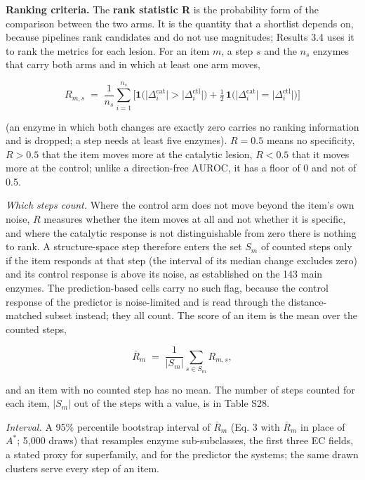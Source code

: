 \documentclass[
  10pt,
]{article}
\DeclareRobustCommand{\_}{\textunderscore\hspace{0pt}}
\begin{document}
\textbf{Ranking
criteria.} The
\textbf{rank
statistic R} is the
probability form of
the comparison
between the two
arms. It is the
quantity that a
shortlist depends
on, because
pipelines rank
candidates and do
not use magnitudes;
Results 3.4 uses it
to rank the metrics
for each lesion. For
an item \(m\), a
step \(s\) and the
\(n_s\) enzymes that
carry both arms and
in which at least
one arm moves,

\begin{equation*}R_{m,s} \;=\; \frac{1}{n_s}\sum_{i=1}^{n_s}\Big[\mathbf{1}\big(\lvert\Delta^{\mathrm{cat}}_{i}\rvert > \lvert\Delta^{\mathrm{ctl}}_{i}\rvert\big) + \tfrac{1}{2}\,\mathbf{1}\big(\lvert\Delta^{\mathrm{cat}}_{i}\rvert = \lvert\Delta^{\mathrm{ctl}}_{i}\rvert\big)\Big] \tag{19}\end{equation*}

(an enzyme in which
both changes are
exactly zero carries
no ranking
information and is
dropped; a step
needs at least five
enzymes).
\(R = 0.5\) means no
specificity,
\(R > 0.5\) that the
item moves more at
the catalytic
lesion, \(R < 0.5\)
that it moves more
at the control;
unlike a
direction-free
AUROC, it has a
floor of 0 and not
of 0.5.

\emph{Which steps
count.} Where the
control arm does not
move beyond the
item's own noise,
\(R\) measures
whether the item
moves at all and not
whether it is
specific, and where
the catalytic
response is not
distinguishable from
zero there is
nothing to rank. A
structure-space step
therefore enters the
set \(S_m\) of
counted steps only
if the item responds
at that step (the
interval of its
median change
excludes zero) and
its control response
is above its noise,
as established on
the 143 main
enzymes. The
prediction-based
cells carry no such
flag, because the
control response of
the predictor is
noise-limited and is
read through the
distance-matched
subset instead; they
all count. The score
of an item is the
mean over the
counted steps,

\begin{equation*}\bar R_m \;=\; \frac{1}{\lvert S_m\rvert}\sum_{s \in S_m} R_{m,s} , \tag{20}\end{equation*}

and an item with no
counted step has no
mean. The number of
steps counted for
each item,
\(\lvert S_m\rvert\)
out of the steps
with a value, is in
Table S28.

\emph{Interval.} A
95\% percentile
bootstrap interval
of \(\bar R_m\) (Eq.
3 with \(\bar R_m\)
in place of
\(A^{*}\); 5,000
draws) that
resamples enzyme
sub-subclasses, the
first three EC
fields, a stated
proxy for
superfamily, and for
the predictor the
systems; the same
drawn clusters serve
every step of an
item.
\end{document}
